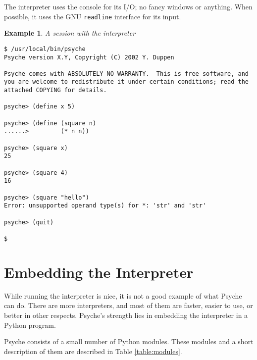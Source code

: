 \documentclass{report}
\newcommand{\file}[1]{\texttt{#1}}
\newtheorem{exmp}{Example}[chapter]
\newenvironment{example}[1]
    {\begin{exmp} \textup{#1}
       \begin{small}}
    {  \end{small}
     \end{exmp}}
\begin{document}
The interpreter uses the console for its I/O; no fancy windows or
anything. When possible, it uses the GNU \file{readline} interface
for its input. 

\begin{example}{A session with the interpreter}
\begin{verbatim}
$ /usr/local/bin/psyche
Psyche version X.Y, Copyright (C) 2002 Y. Duppen

Psyche comes with ABSOLUTELY NO WARRANTY.  This is free software, and
you are welcome to redistribute it under certain conditions; read the
attached COPYING for details.

psyche> (define x 5)

psyche> (define (square n)
......>         (* n n))

psyche> (square x)
25

psyche> (square 4)
16

psyche> (square "hello")
Error: unsupported operand type(s) for *: 'str' and 'str'

psyche> (quit)

$
\end{verbatim}
\end{example}


%
%
\chapter{Embedding the Interpreter}
\label{chap:embedding}
While running the interpreter is nice, it is not a good example of
what Psyche can do. There are more interpreters, and most of them are
faster, easier to use, or better in other respects. Psyche's strength
lies in embedding the interpreter in a Python program.

Psyche consists of a small number of Python modules. These modules and
a short description of them are described in Table \ref{table:modules}. 
\end{document}
